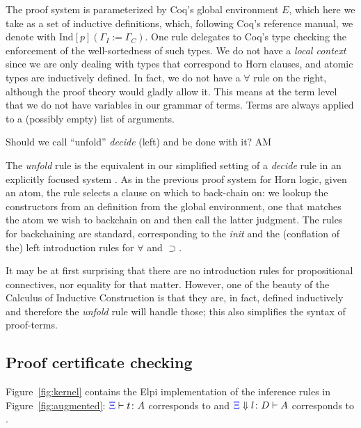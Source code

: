 The proof system is parameterized by Coq's global environment $E$, which
here we take as a set of inductive definitions,
which, following Coq's reference manual, we denote with
$\mathrm{Ind}[p]  (\Gamma_I := \Gamma_C)$.  One  rule delegates
to Coq's type checking the enforcement of the well-sortedness of such types. We
do not have a \emph{local context} since we are only dealing with types
that correspond to Horn clauses, and atomic types are inductively
defined. In fact, we do not have a $\forall$ rule on the right,
although the proof theory would gladly allow it. This means at the
term level that we do not have variables in our grammar of
terms. Terms are always applied to a (possibly empty) list of
arguments.
\begin{metanote}
  Should we call ``unfold'' \emph{decide} (left) and be done with it? AM
\end{metanote}
The \emph{unfold} rule is the equivalent in our simplified setting of
a \emph{decide} rule in an explicitly focused system
\cite{liang09tcs}.  As in the previous proof system for Horn logic,  given an atom,
the rule selects a clause on which to back-chain on: we lookup the
constructors from an  definition from the global
environment, one that matches the atom we wish to backchain on and then
call the latter judgment. The rules for backchaining are standard,
corresponding to the \emph{init} and the (conflation of the) left introduction rules for
$\forall$ and $\supset$.

It may be at first surprising that there are no
introduction rules for propositional connectives, nor equality for
that matter. However, one of the beauty of the Calculus of Inductive
Construction is that they are, in fact,  defined inductively and
therefore the \emph{unfold} rule will handle those; this also
simplifies the syntax of proof-terms.

\subsection{Proof certificate checking}
\label{ssec:cert}
Figure~\ref{fig:kernel} contains the Elpi implementation of the
inference rules in Figure~\ref{fig:augmented}: ${\color{blue}{\Xi}}\vdash t \colon A$ corresponds to
 and ${\color{blue}{\Xi}} \Downarrow  l \colon D\vdash A$ corresponds to
.


